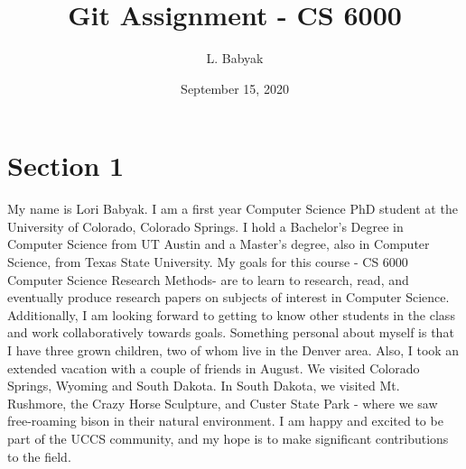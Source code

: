 %
%

%
%
%
%



%

\title{Git Assignment - CS 6000}
\author{L. Babyak}
\date{September 15, 2020}
\maketitle

\section{Section 1}

My name is Lori Babyak.  I am a first year Computer Science PhD student at the University of Colorado, Colorado Springs. I hold a Bachelor's Degree in Computer Science from UT Austin and a Master's degree, also in Computer Science, from Texas State University. My goals for this course - CS 6000 Computer Science Research Methods- are to learn to research, read, and eventually produce research papers on subjects of interest in Computer Science. Additionally, I am looking forward to getting to know other students in the class and work collaboratively towards goals. Something personal about myself is that I have three grown children, two of whom live in the Denver area. Also, I took an extended vacation with a couple of friends in August. We visited Colorado Springs, Wyoming and South Dakota. In South Dakota, we visited Mt. Rushmore, the Crazy Horse Sculpture, and Custer State Park - where we saw free-roaming bison in their natural environment. I am happy and excited to be part of the UCCS community, and my hope is to make significant contributions to the field.

